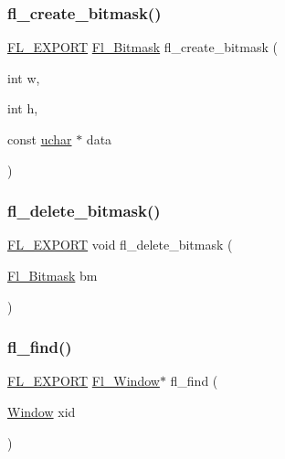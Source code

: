 \subsubsection{\texorpdfstring{fl\+\_\+create\+\_\+bitmask()}{fl\_create\_bitmask()}}
{\footnotesize\ttfamily \hyperlink{_fl___export_8_h_aa9ba29a18aee9d738370a06eeb4470fc}{F\+L\+\_\+\+E\+X\+P\+O\+RT} \hyperlink{mac_8_h_a90133b6f8cfb11ab81d83b2c4d91310d}{Fl\+\_\+\+Bitmask} fl\+\_\+create\+\_\+bitmask (\begin{DoxyParamCaption}\item[{int}]{w,  }\item[{int}]{h,  }\item[{const \hyperlink{fl__types_8h_a65f85814a8290f9797005d3b28e7e5fc}{uchar} $\ast$}]{data }\end{DoxyParamCaption})}

\mbox{\label{win32_8_h_a79b34dfedfba622e0626dd5832ca71f2}} 
\subsubsection{\texorpdfstring{fl\+\_\+delete\+\_\+bitmask()}{fl\_delete\_bitmask()}}
{\footnotesize\ttfamily \hyperlink{_fl___export_8_h_aa9ba29a18aee9d738370a06eeb4470fc}{F\+L\+\_\+\+E\+X\+P\+O\+RT} void fl\+\_\+delete\+\_\+bitmask (\begin{DoxyParamCaption}\item[{\hyperlink{mac_8_h_a90133b6f8cfb11ab81d83b2c4d91310d}{Fl\+\_\+\+Bitmask}}]{bm }\end{DoxyParamCaption})}

\mbox{\label{win32_8_h_a4f60f8f2a47f584ee83dd0118a058cfe}} 
\subsubsection{\texorpdfstring{fl\+\_\+find()}{fl\_find()}}
{\footnotesize\ttfamily \hyperlink{_fl___export_8_h_aa9ba29a18aee9d738370a06eeb4470fc}{F\+L\+\_\+\+E\+X\+P\+O\+RT} \hyperlink{class_fl___window}{Fl\+\_\+\+Window}$\ast$ fl\+\_\+find (\begin{DoxyParamCaption}\item[{\hyperlink{mac_8_h_a213656d363e884b651cc92f58e863fc6}{Window}}]{xid }\end{DoxyParamCaption})}

